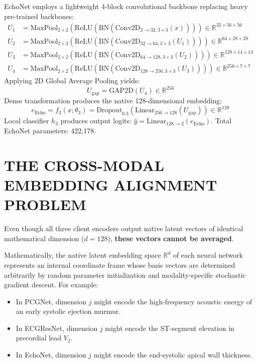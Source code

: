 \documentclass[12pt,a4paper]{amritareport}
\begin{document}
EchoNet employs a lightweight 4-block convolutional backbone replacing heavy pre-trained backbones:
\begin{align}
	U_1 &= \text{MaxPool}_{2 \times 2}\left(\text{ReLU}\left(\text{BN}\left(\text{Conv2D}_{2 \rightarrow 32, 3 \times 3}(x)\right)\right)\right) \in \mathbb{R}^{32 \times 56 \times 56} \\
	U_2 &= \text{MaxPool}_{2 \times 2}\left(\text{ReLU}\left(\text{BN}\left(\text{Conv2D}_{32 \rightarrow 64, 3 \times 3}(U_1)\right)\right)\right) \in \mathbb{R}^{64 \times 28 \times 28} \\
	U_3 &= \text{MaxPool}_{2 \times 2}\left(\text{ReLU}\left(\text{BN}\left(\text{Conv2D}_{64 \rightarrow 128, 3 \times 3}(U_2)\right)\right)\right) \in \mathbb{R}^{128 \times 14 \times 14} \\
	U_4 &= \text{MaxPool}_{2 \times 2}\left(\text{ReLU}\left(\text{BN}\left(\text{Conv2D}_{128 \rightarrow 256, 3 \times 3}(U_3)\right)\right)\right) \in \mathbb{R}^{256 \times 7 \times 7}
\end{align}
Applying 2D Global Average Pooling yields:
\begin{equation}
	U_{\text{gap}} = \text{GAP2D}(U_4) \in \mathbb{R}^{256}
\end{equation}
Dense transformation produces the native 128-dimensional embedding:
\begin{equation}
	e_{\text{Echo}} = f_3(x; \theta_3) = \text{Dropout}_{0.3}\left(\text{Linear}_{256 \rightarrow 128}(U_{\text{gap}})\right) \in \mathbb{R}^{128}
\end{equation}
Local classifier $h_3$ produces output logits: $\hat{y} = \text{Linear}_{128 \rightarrow 2}(e_{\text{Echo}})$. Total EchoNet parameters: 422,178.


\section{THE CROSS-MODAL EMBEDDING ALIGNMENT PROBLEM}

Even though all three client encoders output native latent vectors of identical mathematical dimension ($d = 128$), \textbf{these vectors cannot be averaged}. 

Mathematically, the native latent embedding space $\mathbb{R}^d$ of each neural network represents an internal coordinate frame whose basis vectors are determined arbitrarily by random parameter initialization and modality-specific stochastic gradient descent. For example:
\begin{itemize}
	\item In PCGNet, dimension $j$ might encode the high-frequency acoustic energy of an early systolic ejection murmur.
	\item In ECGResNet, dimension $j$ might encode the ST-segment elevation in precordial lead $V_2$.
	\item In EchoNet, dimension $j$ might encode the end-systolic apical wall thickness.
\end{itemize}
\end{document}
